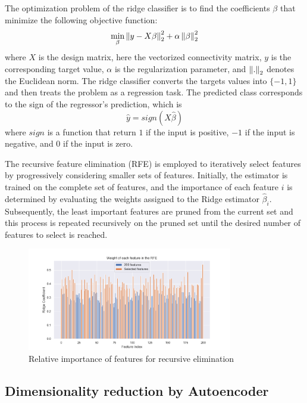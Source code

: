 The optimization problem of the ridge classifier is to find the coefficients $\beta$ that minimize the following objective function:
$$
\min_{\beta} \left\lVert y - X\beta\right\rVert_2^2 + \alpha \left\lVert\beta\right\rVert_2^2
$$
where $X$ is the design matrix, here the vectorized connectivity matrix, $y$ is the corresponding target value, $\alpha$ is the regularization parameter, and $\left\lVert.\right\rVert_2$ denotes the Euclidean norm. The ridge classifier converts the targets values into $\{-1, 1\}$ and then treats the problem as a regression task. The predicted class corresponds to the sign of the regressor's prediction, which is
$$
\hat{y} = sign(X\hat{\beta})
$$
where $sign$ is a function that return $1$ if the input is positive, $-1$ if the input is negative, and $0$ if the input is zero.

The recursive feature elimination (RFE) is employed to iteratively select features by progressively considering smaller sets of features. Initially, the estimator is trained on the complete set of features, and the importance of each feature $i$ is determined by evaluating the weights assigned to the Ridge estimator $\hat{\beta}_i$. Subsequently, the least important features are pruned from the current set and this process is repeated recursively on the pruned set until the desired number of features to select is reached.
\begin{figure}[t!]
    \centering
    \includegraphics[width=0.8\textwidth]{figures/rfe.png}
    \caption{Relative importance of features for recursive elimination}
    \label{fig:rfe}
    \Description{}
\end{figure}

\subsection{Dimensionality reduction by Autoencoder}

